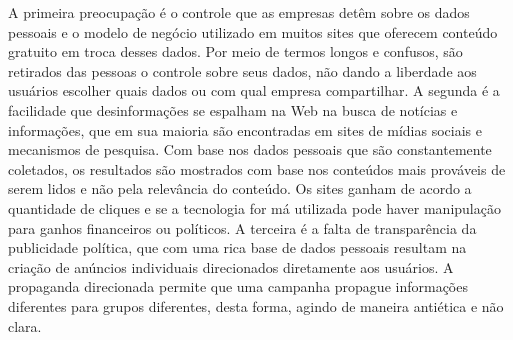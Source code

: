 A primeira preocupação é o controle que as empresas detêm sobre os dados pessoais e o modelo de negócio utilizado em muitos sites que oferecem conteúdo gratuito em troca desses dados. Por meio de termos longos e confusos, são retirados das pessoas o controle sobre seus dados, não dando a liberdade aos usuários escolher quais dados ou com qual empresa compartilhar. 
A segunda é a facilidade que desinformações se espalham na Web na busca de notícias e informações, %
que em sua maioria são encontradas em sites de mídias sociais e mecanismos de pesquisa. Com base 
nos dados pessoais que são constantemente coletados, os resultados são mostrados com base nos conteúdos mais prováveis de serem lidos e não pela relevância do conteúdo. Os sites ganham de acordo a quantidade de cliques e se a tecnologia for má utilizada pode haver manipulação para ganhos financeiros ou políticos. 
A terceira é a falta de transparência da publicidade política, que com uma rica base de dados pessoais resultam na criação de anúncios individuais direcionados diretamente aos usuários. A propaganda direcionada permite que uma campanha propague informações diferentes para grupos diferentes, desta forma, agindo de maneira antiética e não clara. 

